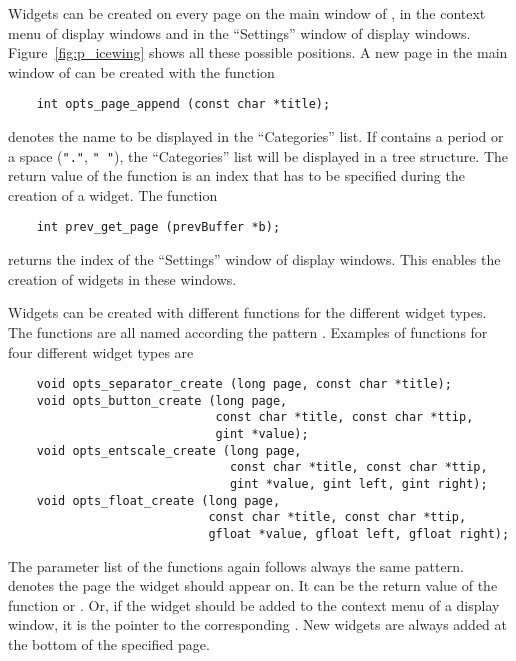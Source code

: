 Widgets can be created on every page on the main window of
\icewing{}, in the context menu of display windows and in the
``Settings'' window of display windows. Figure~\ref{fig:p_icewing}
shows all these possible positions. A new page in the main window of
\icewing{} can be created with the function
\begin{small}
\linespread{0.9}
\begin{verbatim}
    int opts_page_append (const char *title);
\end{verbatim}
\end{small}
 denotes the name to be displayed in the ``Categories''
list. If  contains a period or a space (\verb|"."|,
\verb|" "|), the ``Categories'' list will be displayed in a tree
structure. The return value of the function
 is an index that has to be specified
during the creation of a widget. The function
\begin{small}
\linespread{0.9}
\begin{verbatim}
    int prev_get_page (prevBuffer *b);
\end{verbatim}
\end{small}
returns the index of the ``Settings'' window of display
windows. This enables the creation of widgets in these windows.

Widgets can be created with different functions for the different
widget types. The functions are all named according the pattern
. Examples of functions for four
different widget types are
\begin{small}
\linespread{0.9}
\begin{verbatim}
    void opts_separator_create (long page, const char *title);
    void opts_button_create (long page,
                             const char *title, const char *ttip,
                             gint *value);
    void opts_entscale_create (long page,
                               const char *title, const char *ttip,
                               gint *value, gint left, gint right);
    void opts_float_create (long page,
                            const char *title, const char *ttip,
                            gfloat *value, gfloat left, gfloat right);
\end{verbatim}
\end{small}
The parameter list of the functions again follows always the same
pattern.  denotes the page the widget should appear on. It
can be the return value of the function 
or . Or, if the widget should be added to the
context menu of a display window, it is the pointer to the
corresponding . New widgets are always added at the
bottom of the specified page.

